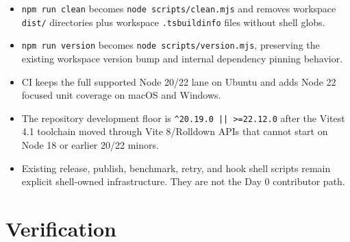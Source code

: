 \begin{itemize}
\tightlist
\item
  \texttt{n\allowbreak{}p\allowbreak{}m\allowbreak{} \allowbreak{}r\allowbreak{}u\allowbreak{}n\allowbreak{} \allowbreak{}c\allowbreak{}l\allowbreak{}e\allowbreak{}a\allowbreak{}n} becomes \texttt{n\allowbreak{}o\allowbreak{}d\allowbreak{}e\allowbreak{} \allowbreak{}s\allowbreak{}c\allowbreak{}r\allowbreak{}i\allowbreak{}p\allowbreak{}t\allowbreak{}s\allowbreak{}/\allowbreak{}c\allowbreak{}l\allowbreak{}e\allowbreak{}a\allowbreak{}n\allowbreak{}.\allowbreak{}m\allowbreak{}j\allowbreak{}s} and removes workspace \texttt{d\allowbreak{}i\allowbreak{}s\allowbreak{}t\allowbreak{}/} directories plus workspace \texttt{.\allowbreak{}t\allowbreak{}s\allowbreak{}b\allowbreak{}u\allowbreak{}i\allowbreak{}l\allowbreak{}d\allowbreak{}i\allowbreak{}n\allowbreak{}f\allowbreak{}o} files without shell globs.
\item
  \texttt{n\allowbreak{}p\allowbreak{}m\allowbreak{} \allowbreak{}r\allowbreak{}u\allowbreak{}n\allowbreak{} \allowbreak{}v\allowbreak{}e\allowbreak{}r\allowbreak{}s\allowbreak{}i\allowbreak{}o\allowbreak{}n} becomes \texttt{n\allowbreak{}o\allowbreak{}d\allowbreak{}e\allowbreak{} \allowbreak{}s\allowbreak{}c\allowbreak{}r\allowbreak{}i\allowbreak{}p\allowbreak{}t\allowbreak{}s\allowbreak{}/\allowbreak{}v\allowbreak{}e\allowbreak{}r\allowbreak{}s\allowbreak{}i\allowbreak{}o\allowbreak{}n\allowbreak{}.\allowbreak{}m\allowbreak{}j\allowbreak{}s}, preserving the existing workspace version bump and internal dependency pinning behavior.
\item
  CI keeps the full supported Node 20/22 lane on Ubuntu and adds Node 22 focused unit coverage on macOS and Windows.
\item
  The repository development floor is \texttt{\textasciicircum{}\allowbreak{}2\allowbreak{}0\allowbreak{}.\allowbreak{}1\allowbreak{}9\allowbreak{}.\allowbreak{}0\allowbreak{} \allowbreak{}|\allowbreak{}|\allowbreak{} \allowbreak{}>\allowbreak{}=\allowbreak{}2\allowbreak{}2\allowbreak{}.\allowbreak{}1\allowbreak{}2\allowbreak{}.\allowbreak{}0} after the Vitest 4.1 toolchain moved through Vite 8/Rolldown APIs that cannot start on Node 18 or earlier 20/22 minors.
\item
  Existing release, publish, benchmark, retry, and hook shell scripts remain explicit shell-owned infrastructure. They are not the Day 0 contributor path.
\end{itemize}

\section{Verification}\label{record-206-verification}

